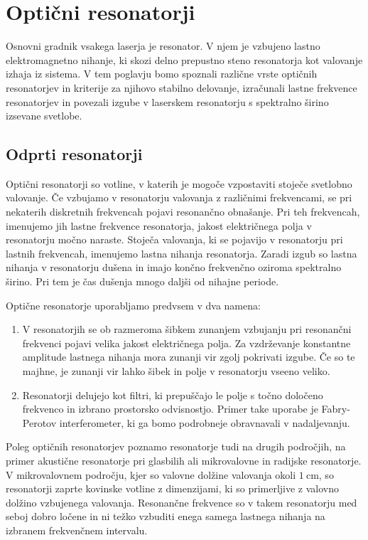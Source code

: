 
\chapter{Optični resonatorji}
Osnovni gradnik vsakega laserja je resonator. V njem je vzbujeno lastno elektromagnetno
nihanje, ki skozi delno prepustno steno resonatorja kot valovanje
izhaja iz sistema. V tem poglavju bomo 
spoznali različne vrste optičnih resonatorjev in kriterije za njihovo stabilno delovanje,
izračunali lastne frekvence resonatorjev in povezali izgube v laserskem resonatorju s
spektralno širino izsevane svetlobe.

\section{Odprti resonatorji}
Optični resonatorji so votline, v katerih je mogoče 
vzpostaviti stoječe svetlobno valovanje. Če vzbujamo v resonatorju valovanja z 
različnimi frekvencami, se pri nekaterih diskretnih frekvencah pojavi resonančno
obnašanje. Pri teh frekvencah, imenujemo jih lastne frekvence
resonatorja, jakost električnega polja v resonatorju močno naraste. Stoječa valovanja, ki
se pojavijo v resonatorju pri lastnih frekvencah, imenujemo lastna nihanja resonatorja.
Zaradi izgub so lastna nihanja v resonatorju dušena in imajo končno frekvenčno oziroma spektralno 
širino. Pri tem je čas dušenja mnogo daljši od nihajne periode. 

Optične resonatorje uporabljamo predvsem v dva namena:
\begin{enumerate}
\item V resonatorjih se ob razmeroma šibkem zunanjem vzbujanju 
pri resonančni frekvenci pojavi velika jakost
električnega polja. Za vzdrževanje
konstantne amplitude lastnega nihanja mora zunanji vir zgolj pokrivati izgube. 
Če so te majhne, je zunanji vir lahko šibek in polje
v resonatorju vseeno veliko.
\item Resonatorji delujejo kot filtri, ki prepuščajo le polje s točno  
določeno frekvenco in izbrano prostorsko odvisnostjo. Primer take uporabe je 
Fabry-Perotov interferometer, ki ga bomo podrobneje
obravnavali v nadaljevanju.
\end{enumerate}

\begin{remark}
Poleg optičnih resonatorjev poznamo resonatorje tudi na drugih področjih, 
na primer akustične resonatorje pri glasbilih ali mikrovalovne in radijske resonatorje. 
V mikrovalovnem področju, kjer so valovne dolžine valovanja
okoli $1~\si{\centi\metre}$, 
so resonatorji zaprte kovinske votline z dimenzijami, ki so primerljive z 
valovno dolžino vzbujenega valovanja. Resonančne frekvence so v takem resonatorju 
med seboj dobro ločene in ni težko vzbuditi enega samega lastnega nihanja na izbranem 
frekvenčnem intervalu.
\end{remark}


